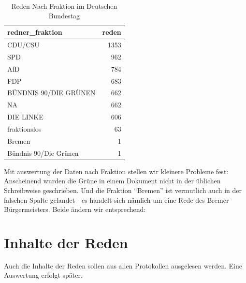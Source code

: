 \documentclass[oneside, 12pt, numbers=endperiod]{scrbook}
\newenvironment{Shaded}{\begin{snugshade}}{\end{snugshade}}
\newcommand{\DataTypeTok}[1]{\textcolor[rgb]{0.13,0.29,0.53}{#1}}
\newcommand{\DecValTok}[1]{\textcolor[rgb]{0.00,0.00,0.81}{#1}}
\newcommand{\KeywordTok}[1]{\textcolor[rgb]{0.13,0.29,0.53}{\textbf{#1}}}
\newcommand{\NormalTok}[1]{#1}
\newcommand{\OperatorTok}[1]{\textcolor[rgb]{0.81,0.36,0.00}{\textbf{#1}}}
\newcommand{\StringTok}[1]{\textcolor[rgb]{0.31,0.60,0.02}{#1}}
\theoremstyle{definition}
\theoremstyle{definition}
\theoremstyle{definition}
\theoremstyle{remark}
\begin{document}
\begin{table}

\caption{\label{tab:unnamed-chunk-18}Reden Nach Fraktion im Deutschen Bundestag}
\centering
\begin{tabular}[t]{lr}
\toprule
redner\_fraktion & reden\\
\midrule
CDU/CSU & 1353\\
SPD & 962\\
AfD & 784\\
FDP & 683\\
BÜNDNIS 90/DIE GRÜNEN & 662\\
\addlinespace
NA & 662\\
DIE LINKE & 606\\
fraktionslos & 63\\
Bremen & 1\\
Bündnis 90/Die Grünen & 1\\
\bottomrule
\end{tabular}
\end{table}

Mit auswertung der Daten nach Fraktion stellen wir kleinere Probleme
fest: Anscheinend wurden die Grüne in einem Dokument nicht in der
üblichen Schreibweise geschrieben. Und die Fraktion ``Bremen'' ist
vermutlich auch in der falschen Spalte gelandet - es handelt sich
nämlich um eine Rede des Bremer Bürgermeisters. Beide ändern wir
entsprechend:

\begin{Shaded}
\end{Shaded}

\hypertarget{inhalte-der-reden}{%
\section{Inhalte der Reden}\label{inhalte-der-reden}}

Auch die Inhalte der Reden sollen aus allen Protokollen ausgelesen
werden. Eine Auswertung erfolgt später.
\end{document}
